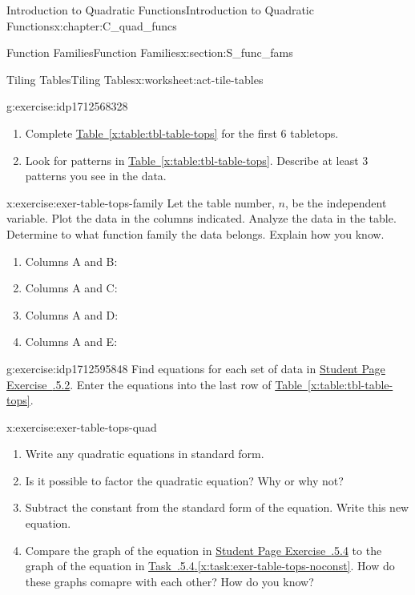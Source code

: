 \documentclass[oneside,10pt,]{book}
\newcommand{\xreffont}{\relax}
\numberwithin{equation}{chapter}
\begin{document}
\begin{chapterptx}{Introduction to Quadratic Functions}{}{Introduction to Quadratic Functions}{}{}{x:chapter:C_quad_funcs}
\begin{sectionptx}{Function Families}{}{Function Families}{}{}{x:section:S_func_fams}
\begin{worksheet-subsection}{Tiling Tables}{}{Tiling Tables}{}{}{x:worksheet:act-tile-tables}
\begin{divisionexercise}{1}{}{}{g:exercise:idp1712568328}
\begin{enumerate}[font=\bfseries,label=(\alph*),ref=\alph*]
\item{}Complete \hyperref[x:table:tbl-table-tops]{Table~{\xreffont\ref{x:table:tbl-table-tops}}} for the first 6 tabletops.%
\item{}Look for patterns in \hyperref[x:table:tbl-table-tops]{Table~{\xreffont\ref{x:table:tbl-table-tops}}}. Describe at least 3 patterns you see in the data.%
\end{enumerate}
\end{divisionexercise}%
\begin{divisionexercise}{2}{}{}{x:exercise:exer-table-tops-family}%
Let the table number, \(n\), be the independent variable. Plot the data in the columns indicated. Analyze the data in the table. Determine to what function family the data belongs. Explain how you know.%
\begin{enumerate}[font=\bfseries,label=(\alph*),ref=\alph*]
\item{}Columns A and B:%
\item{}Columns A and C:%
\item{}Columns A and D:%
\item{}Columns A and E:%
\end{enumerate}
\end{divisionexercise}%
\begin{divisionexercise}{3}{}{}{g:exercise:idp1712595848}%
Find equations for each set of data in \hyperlink{x:exercise:exer-table-tops-family}{Student Page Exercise~{\xreffont 4.5.5.2}}. Enter the equations into the last row of \hyperref[x:table:tbl-table-tops]{Table~{\xreffont\ref{x:table:tbl-table-tops}}}.%
\end{divisionexercise}%
\begin{divisionexercise}{4}{}{}{x:exercise:exer-table-tops-quad}%
\begin{enumerate}[font=\bfseries,label=(\alph*),ref=\alph*]
\item{}Write any quadratic equations in standard form.%
\item{}Is it possible to factor the quadratic equation? Why or why not?%
\item\label{x:task:exer-table-tops-noconst}Subtract the constant from the standard form of the equation. Write this new equation.%
\item{}Compare the graph of the equation in \hyperlink{x:exercise:exer-table-tops-quad}{Student Page Exercise~{\xreffont 4.5.5.4}} to the graph of the equation in \hyperref[x:task:exer-table-tops-noconst]{Task~{\xreffont 4.5.5.4}.{\xreffont\ref{x:task:exer-table-tops-noconst}}}. How do these graphs comapre with each other? How do you know?%

\end{enumerate}
\end{divisionexercise}
\end{worksheet-subsection}
\end{sectionptx}
\end{chapterptx}
\end{document}
